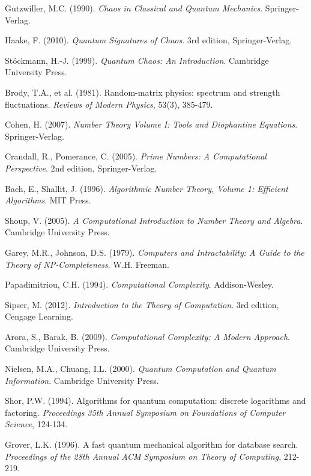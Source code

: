 \documentclass[12pt]{article}
\theoremstyle{plain}
\theoremstyle{definition}
\begin{document}
\begin{thebibliography}{99}
 Gutzwiller, M.C. (1990). \emph{Chaos in Classical and Quantum Mechanics}. Springer-Verlag.

 Haake, F. (2010). \emph{Quantum Signatures of Chaos}. 3rd edition, Springer-Verlag.

 Stöckmann, H.-J. (1999). \emph{Quantum Chaos: An Introduction}. Cambridge University Press.

 Brody, T.A., et al. (1981). Random-matrix physics: spectrum and strength fluctuations. \emph{Reviews of Modern Physics}, 53(3), 385-479.

 Cohen, H. (2007). \emph{Number Theory Volume I: Tools and Diophantine Equations}. Springer-Verlag.

 Crandall, R., Pomerance, C. (2005). \emph{Prime Numbers: A Computational Perspective}. 2nd edition, Springer-Verlag.

 Bach, E., Shallit, J. (1996). \emph{Algorithmic Number Theory, Volume 1: Efficient Algorithms}. MIT Press.

 Shoup, V. (2005). \emph{A Computational Introduction to Number Theory and Algebra}. Cambridge University Press.

 Garey, M.R., Johnson, D.S. (1979). \emph{Computers and Intractability: A Guide to the Theory of NP-Completeness}. W.H. Freeman.

 Papadimitriou, C.H. (1994). \emph{Computational Complexity}. Addison-Wesley.

 Sipser, M. (2012). \emph{Introduction to the Theory of Computation}. 3rd edition, Cengage Learning.

 Arora, S., Barak, B. (2009). \emph{Computational Complexity: A Modern Approach}. Cambridge University Press.

 Nielsen, M.A., Chuang, I.L. (2000). \emph{Quantum Computation and Quantum Information}. Cambridge University Press.

 Shor, P.W. (1994). Algorithms for quantum computation: discrete logarithms and factoring. \emph{Proceedings 35th Annual Symposium on Foundations of Computer Science}, 124-134.

 Grover, L.K. (1996). A fast quantum mechanical algorithm for database search. \emph{Proceedings of the 28th Annual ACM Symposium on Theory of Computing}, 212-219.


\end{thebibliography}
\end{document}
